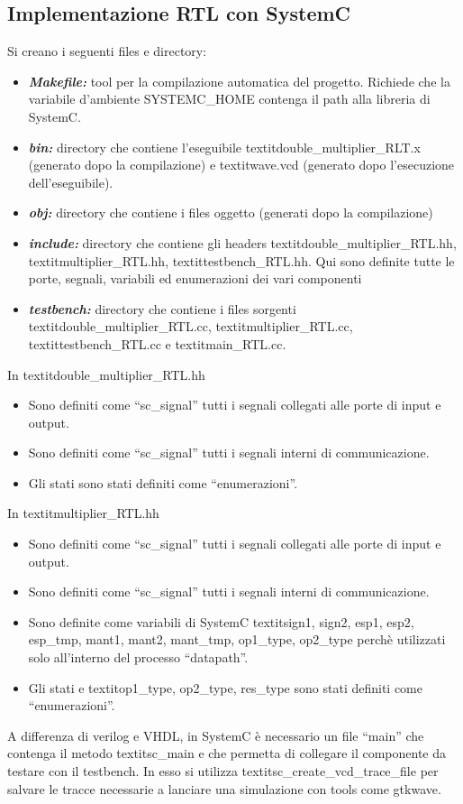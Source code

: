 \documentclass[]{IEEEtran}
\begin{document}
\subsection{Implementazione RTL con SystemC}
Si creano i seguenti files e directory:
\begin{itemize}
    \item {\it\bf Makefile:} tool per la compilazione automatica del progetto. Richiede che la variabile d'ambiente SYSTEMC\_HOME contenga il path alla libreria di SystemC.
    \item {\it\bf bin:} directory che contiene l'eseguibile textit{double\_multiplier\_RLT.x} (generato dopo la compilazione) e textit{wave.vcd} (generato dopo l'esecuzione dell'eseguibile).
    \item {\it\bf obj:} directory che contiene i files oggetto (generati dopo la compilazione)
    \item {\it\bf include:} directory che contiene gli headers textit{double\_multiplier\_RTL.hh}, textit{multiplier\_RTL.hh}, textit{testbench\_RTL.hh}. Qui sono definite tutte le porte, segnali, variabili ed enumerazioni dei vari componenti
    \item {\it\bf testbench:} directory che contiene i files sorgenti textit{double\_multiplier\_RTL.cc}, textit{multiplier\_RTL.cc}, textit{testbench\_RTL.cc} e textit{main\_RTL.cc}.
\end{itemize}
In textit{double\_multiplier\_RTL.hh}
\begin{itemize}
    \item Sono definiti come ``sc\_signal'' tutti i segnali collegati alle porte di input e output.
    \item Sono definiti come ``sc\_signal'' tutti i segnali interni di communicazione.
    \item Gli stati sono stati definiti come ``enumerazioni''.
\end{itemize}
In textit{multiplier\_RTL.hh}
\begin{itemize}
    \item Sono definiti come ``sc\_signal'' tutti i segnali collegati alle porte di input e output.
    \item Sono definiti come ``sc\_signal'' tutti i segnali interni di communicazione.
    \item Sono definite come variabili di SystemC textit{sign1, sign2, esp1, esp2, esp\_tmp, mant1, mant2, mant\_tmp, op1\_type, op2\_type} perchè utilizzati solo all'interno del processo ``datapath''.
    \item Gli stati e textit{op1\_type, op2\_type, res\_type} sono stati definiti come ``enumerazioni''.
\end{itemize}
A differenza di verilog e VHDL, in SystemC è necessario un file ``main'' che contenga il metodo textit{sc\_main} e che permetta di collegare il componente da testare con il testbench. In esso si utilizza textit{sc\_create\_vcd\_trace\_file} per salvare le tracce necessarie a lanciare una simulazione con tools come gtkwave.
\end{document}
